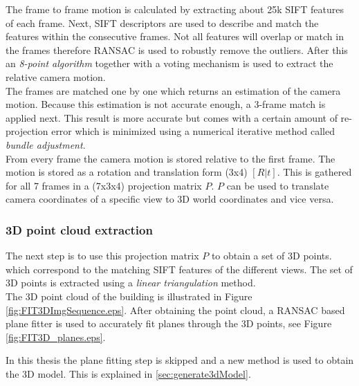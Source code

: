 The frame to frame motion is calculated by extracting about 25k SIFT features of
each frame.  Next, SIFT descriptors are used to describe and match the features
within the consecutive frames.  Not all features will overlap or match in the
frames therefore RANSAC\cite{kovesi} is used to robustly remove the outliers.  After this an
\emph{8-point algorithm\cite{hartley}} together with a voting mechanism is used to extract the
relative camera motion.\\

The frames are matched one by one which returns an estimation of the camera
motion. Because this estimation is not accurate enough, a 3-frame match is
applied next.  This result is more accurate but comes with a certain
amount of re-projection error which is minimized using a numerical
iterative method called \emph{bundle adjustment\cite{bundle}}.  \\

From every frame the camera motion is stored relative to the first frame.
The motion is stored as a rotation and translation 
form (3x4) $[R|t]$. This is gathered for all 7 frames in a (7x3x4) projection matrix $P$.
$P$ can be used to translate camera coordinates of a specific view 
 to 3D world coordinates and vice versa.

\subsubsection{3D point cloud extraction}
The next step is to use this projection matrix $P$ to obtain a set of 3D points.
which correspond to the matching SIFT features of the different views.  
The set of 3D points is extracted using a \emph{linear triangulation\cite{hartley}} method. \\
The 3D point cloud of the building is illustrated in Figure
\ref{fig:FIT3DImgSequence.eps}.
After obtaining the point cloud, a RANSAC based plane fitter \cite{kovesi} is used to accurately fit planes through
the 3D points, see Figure \ref{fig:FIT3D_planes.eps}.\\

In this thesis the plane fitting step is skipped and a new method is
used to obtain the 3D model. This is explained in \ref{sec:generate3dModel}.

% 




